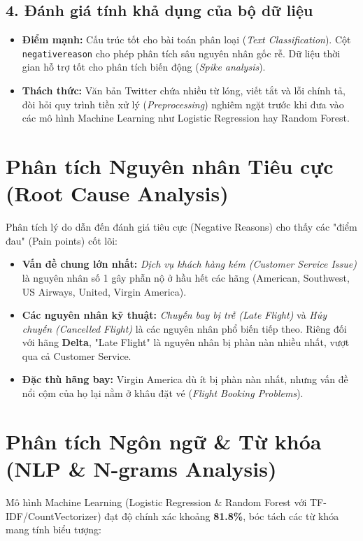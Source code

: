 \documentclass{article}
\begin{document}
\subsection{4. Đánh giá tính khả dụng của bộ dữ liệu}
\begin{itemize}
    \item \textbf{Điểm mạnh:} Cấu trúc tốt cho bài toán phân loại (\textit{Text Classification}). Cột \texttt{negativereason} cho phép phân tích sâu nguyên nhân gốc rễ. Dữ liệu thời gian hỗ trợ tốt cho phân tích biến động (\textit{Spike analysis}).
    \item \textbf{Thách thức:} Văn bản Twitter chứa nhiều từ lóng, viết tắt và lỗi chính tả, đòi hỏi quy trình tiền xử lý (\textit{Preprocessing}) nghiêm ngặt trước khi đưa vào các mô hình Machine Learning như Logistic Regression hay Random Forest.
\end{itemize}

\section{Phân tích Nguyên nhân Tiêu cực (Root Cause Analysis)}
Phân tích lý do dẫn đến đánh giá tiêu cực (Negative Reasons) cho thấy các "điểm đau" (Pain points) cốt lõi:

\begin{itemize}
    \item \textbf{Vấn đề chung lớn nhất:} \textit{Dịch vụ khách hàng kém (Customer Service Issue)} là nguyên nhân số 1 gây phẫn nộ ở hầu hết các hãng (American, Southwest, US Airways, United, Virgin America).
    \item \textbf{Các nguyên nhân kỹ thuật:} \textit{Chuyến bay bị trễ (Late Flight)} và \textit{Hủy chuyến (Cancelled Flight)} là các nguyên nhân phổ biến tiếp theo. Riêng đối với hãng \textbf{Delta}, "Late Flight" là nguyên nhân bị phàn nàn nhiều nhất, vượt qua cả Customer Service.
    \item \textbf{Đặc thù hãng bay:} Virgin America dù ít bị phàn nàn nhất, nhưng vấn đề nổi cộm của họ lại nằm ở khâu đặt vé (\textit{Flight Booking Problems}).
\end{itemize}

\section{Phân tích Ngôn ngữ \& Từ khóa (NLP \& N-grams Analysis)}
Mô hình Machine Learning (Logistic Regression \& Random Forest với TF-IDF/CountVectorizer) đạt độ chính xác khoảng \textbf{81.8\%}, bóc tách các từ khóa mang tính biểu tượng:
\end{document}
